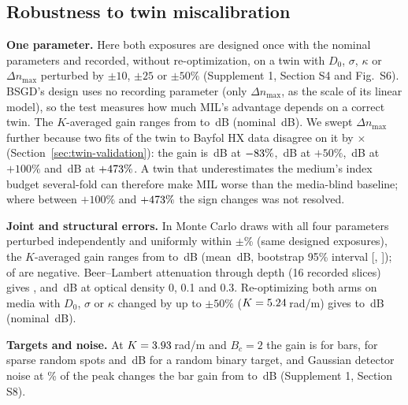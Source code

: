 \documentclass{optica-article}
\begin{document}
\subsection{Robustness to twin miscalibration}
\label{sec:robustness}
\textbf{One parameter.} Here both exposures are designed once with the nominal
parameters and recorded, without re-optimization, on a twin with $D_0$,
$\sigma$, $\kappa$ or $\Delta n_{\max}$ perturbed by $\pm10$, $\pm25$ or
$\pm50\%$ (Supplement 1, Section S4 and Fig.~S6). BSGD's design uses no
recording parameter (only $\Delta n_{\max}$, as the scale of its linear model),
so the test measures how much MIL's advantage depends on a correct twin. The
$K$-averaged gain ranges from \SThreeWorstWithinFifty{} to
\SThreeBestWithinFifty\,dB (nominal \SThreeNominalGain\,dB). We swept
$\Delta n_{\max}$ further because two fits of the twin to Bayfol HX data
disagree on it by \BayfolDnMaxRatio$\times$ (Section~\ref{sec:twin-validation}):
the gain is \SThreeDnMaxAtMostNegative\,dB at
$-83\%$, \SThreeDnMaxAtPlusFifty\,dB at $+50\%$,
\SThreeDnMaxAtHundred\,dB at $+100\%$ and \SThreeDnMaxAtMostPositive\,dB at
$+473\%$. A twin that underestimates the medium's
index budget several-fold can therefore make MIL worse than the media-blind
baseline; where between $+100\%$ and $+473\%$ the sign
changes was not resolved.

\textbf{Joint and structural errors.} In \SSixNDraws{} Monte Carlo draws with
all four parameters perturbed independently and uniformly within
$\pm$\SSixPctRange\% (same designed exposures), the $K$-averaged gain ranges from
\SSixWorstDrawGain{} to \SSixBestDrawGain\,dB (mean \SSixMeanGain\,dB,
bootstrap 95\% interval [\SSixBootCILo, \SSixBootCIHi]); \SSixNNegative{} of
\SSixNDraws{} are negative. Beer--Lambert attenuation through depth (16 recorded
slices) gives \SSevenGainODZero, \SSevenGainODOneTenth{} and
\SSevenGainODThreeTenths\,dB at optical density 0, 0.1 and 0.3. Re-optimizing
both arms on media with $D_0$, $\sigma$ or $\kappa$ changed by up to $\pm50\%$
($K=5.24$\,rad/\textmu m) gives \STwoGainMin{} to \STwoGainMax\,dB
(nominal \STwoBaselineGain\,dB).

\textbf{Targets and noise.} At $K=3.93$\,rad/\textmu m and $B_c=2$ the
gain is \SFourGainBarsTwoX{} for bars, \SFourGainSpotsTwoX{} for sparse random
spots and \SFourGainRandomBinaryTwoX\,dB for a random binary target, and
Gaussian detector noise at \SFiveNoiseStdPct\% of the peak changes the bar
gain from \SFiveNoiselessGain{} to \SFiveNoisyGain\,dB (Supplement 1,
Section S8).
\end{document}
